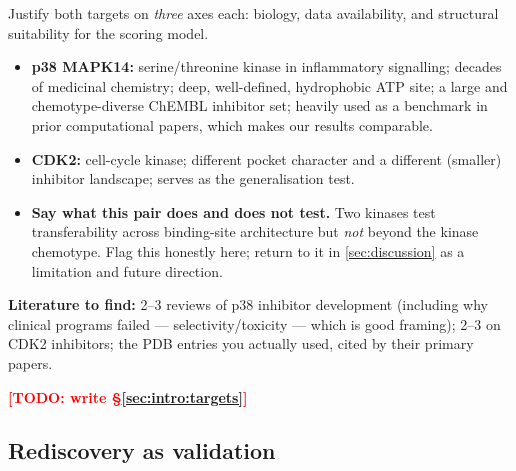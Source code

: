 \documentclass[11pt]{article}
\newcommand{\TODO}[1]{\textcolor{red}{\textbf{[TODO: #1]}}}
\begin{document}
\begin{yourturn}
Justify both targets on \emph{three} axes each: biology, data availability, and
structural suitability for the scoring model.
\begin{itemize}\itemsep0pt
  \item \textbf{p38 MAPK14:} serine/threonine kinase in inflammatory signalling;
        decades of medicinal chemistry; deep, well-defined, hydrophobic
        ATP site; a large and chemotype-diverse ChEMBL inhibitor set; heavily
        used as a benchmark in prior computational papers, which makes our
        results comparable.
  \item \textbf{CDK2:} cell-cycle kinase; different pocket character and a
        different (smaller) inhibitor landscape; serves as the
        generalisation test.
  \item \textbf{Say what this pair does and does not test.} Two kinases test
        transferability across binding-site architecture but \emph{not} beyond
        the kinase chemotype. Flag this honestly here; return to it in
        \cref{sec:discussion} as a limitation and future direction.
\end{itemize}
\textbf{Literature to find:} 2--3 reviews of p38 inhibitor development
(including why clinical programs failed --- selectivity/toxicity --- which is
good framing); 2--3 on CDK2 inhibitors; the PDB entries you actually used, cited
by their primary papers.
\end{yourturn}

\TODO{write \S\ref{sec:intro:targets}}

\subsection{Rediscovery as validation}
\label{sec:intro:rediscovery}
\end{document}
